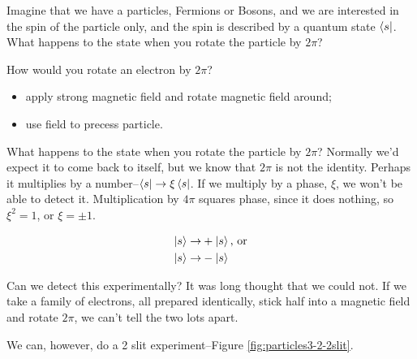 \documentclass[]{article}
\begin{document}
Imagine that we have a particles, Fermions or Bosons, and we are interested in the spin of the particle only, and the spin is described by a quantum state $\bra{s}$. What happens to the state when you rotate the particle by $2\pi$?

How would you rotate an electron by $2\pi$?

\begin{itemize}
	\item apply strong magnetic field and rotate magnetic field around;
	\item use field to precess particle.
\end{itemize}

What happens to the state when you rotate the particle by $2\pi$? Normally we'd expect it to come back to itself, but we know that $2\pi$ is not the identity. Perhaps it multiplies by a number--$\bra{s} \rightarrow \xi \bra{s}$. If we multiply by a phase, $\xi$, we won't be able to detect it. Multiplication by $4\pi$ squares phase, since it does nothing, so $\xi^2=1$, or $\xi=\pm1$.

\begin{align*}
	\ket{s} \rightarrow& +\ket{s} \text{, or}\\
	\ket{s} \rightarrow& -\ket{s}
\end{align*}

Can we detect this experimentally? It was long thought that we could not. If we take a family of electrons, all prepared identically, stick half into a magnetic field and rotate $2\pi$, we can't tell the two lots apart.

We can, however, do a 2 slit experiment\cite{aharonov1967observability}--Figure \ref{fig:particles3-2-2slit}.
\end{document}
